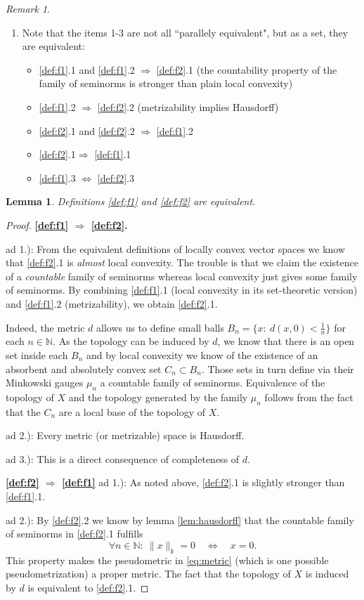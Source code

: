 \documentclass{scrartcl}
\newtheorem{lemma}{Lemma}
\theoremstyle{definition}
\theoremstyle{remark}
\newtheorem{remark}{Remark}
\newcommand{\N}{\mathbb N}
\begin{document}
\begin{remark}
\begin{enumerate}
\item Note that the items 1-3 are not all ``parallely equivalent", but as a set, they are equivalent:
\begin{itemize}
\item \ref{def:f1}.1 and \ref{def:f1}.2 $\Rightarrow$ \ref{def:f2}.1 (the countability property of the family of seminorms is stronger than plain local convexity)
\item \ref{def:f1}.2 $\Rightarrow$ \ref{def:f2}.2 (metrizability implies Hausdorff)
\item \ref{def:f2}.1 and \ref{def:f2}.2 $\Rightarrow$ \ref{def:f1}.2
\item \ref{def:f2}.1$\Rightarrow$ \ref{def:f1}.1 
\item \ref{def:f1}.3 $\Leftrightarrow$ \ref{def:f2}.3
\end{itemize}
\end{enumerate}
\end{remark}
\begin{lemma}
Definitions \ref{def:f1} and \ref{def:f2} are equivalent.
\end{lemma}
\begin{proof}
\textbf{\ref{def:f1} $\Rightarrow$ \ref{def:f2}.}

ad 1.): From the equivalent definitions of locally convex vector spaces we know that \ref{def:f2}.1 is \textit{almost} local convexity. The trouble is that we claim the existence of a \textit{countable} family of seminorms whereas local convexity just gives some family of seminorms. By combining \ref{def:f1}.1 (local convexity in its set-theoretic version) and \ref{def:f1}.2 (metrizability), we obtain \ref{def:f2}.1.

Indeed, the metric $d$ allows us to define small balls $B_n = \{x:~ d(x,0)< \frac{1}{n}\}$ for each $n\in\N$. As the topology can be induced by $d$, we know that there is an open set inside each $B_n$ and by local convexity we know of the existence of an absorbent and absolutely convex set $C_n \subset B_n$. Those sets in turn define via their Minkowski gauges $\mu_n$ a countable family of seminorms. Equivalence of the topology of $X$ and the topology generated by the family $\mu_n$ follows from the fact that the $C_n$ are a local base of the topology of $X$.

ad 2.): Every metric (or metrizable) space is Hausdorff.

ad 3.): This is a direct consequence of completeness of $d$.

\textbf{\ref{def:f2} $\Rightarrow$ \ref{def:f1}}
ad 1.): As noted above, \ref{def:f2}.1 is slightly stronger than \ref{def:f1}.1.

ad 2.): By \ref{def:f2}.2 we know by lemma \ref{lem:hausdorff} that the countable family of seminorms in \ref{def:f2}.1 fulfills
\[\forall n\in \N:~ \|x\|_k = 0 \quad \Leftrightarrow \quad x = 0.  \] 
This property makes the pseudometric in \eqref{eq:metric} (which is one possible pseudometrization) a proper metric. The fact that the topology of $X$ is induced by $d$ is equivalent to \ref{def:f2}.1.
\end{proof}
\end{document}
